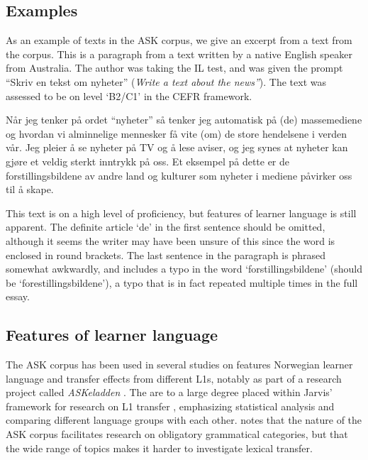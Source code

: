 \subsection{Examples}

As an example of texts in the ASK corpus, we give an excerpt from a text from
the corpus. This is a paragraph from a text written by a native English
speaker from Australia. The author was taking the IL test, and was given the
prompt ``Skriv en tekst om nyheter'' (\emph{Write a text about the news''}).
The text was assessed to be on level `B2/C1' in the CEFR framework.

\begin{displayquote}  %
  Når jeg tenker på ordet ``nyheter'' så tenker jeg automatisk på (de)
  massemediene og hvordan vi alminnelige mennesker få vite (om) de store
  hendelsene i verden vår. Jeg pleier å se nyheter på TV og å lese aviser, og
  jeg synes at nyheter kan gjøre et veldig sterkt inntrykk på oss. Et
  eksempel på dette er de forstillingsbildene av andre land og kulturer som
  nyheter i mediene påvirker oss til å skape.
\end{displayquote}

This text is on a high level of proficiency, but features of learner language
is still apparent. The definite article `de' in the first sentence should be
omitted, although it seems the writer may have been unsure of this since the
word is enclosed in round brackets. The last sentence in the paragraph is
phrased somewhat awkwardly, and includes a typo in the word
`forstillingsbildene' (should be `forestillingsbildene'), a typo that is in
fact repeated multiple times in the full essay.


\subsection{Features of learner language}

The ASK corpus has been used in several studies on features Norwegian learner
language and transfer effects from different \acp{L1}, notably as part of a
research project called \emph{ASKeladden} \autocite{goldentenfjord2015}. The
are to a large degree placed within Jarvis' framework for research on \ac{L1}
transfer \autocite{jarvis2000methodological}, emphasizing statistical
analysis and comparing different language groups with each other. \textcite{goldentenfjord2015}
notes that the nature of the ASK corpus facilitates research on obligatory
grammatical categories, but that the wide range of topics makes it harder to investigate
lexical transfer. 

